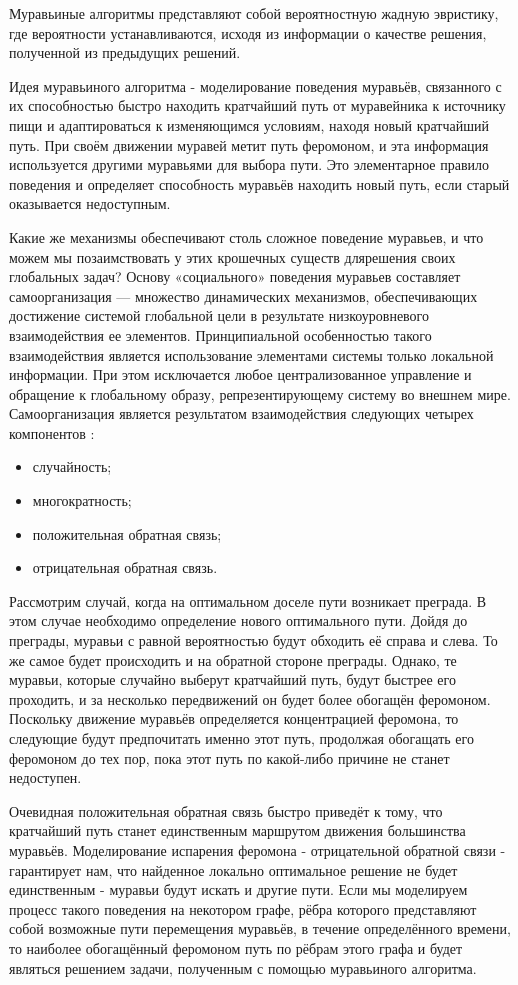 \documentclass[12pt]{report}
\begin{document}
Муравьиные алгоритмы представляют собой вероятностную жадную эвристику, где вероятности устанавливаются, исходя из информации о качестве решения, полученной из предыдущих решений.

Идея муравьиного алгоритма - моделирование поведения муравьёв, связанного с их способностью быстро находить кратчайший путь от муравейника к источнику пищи и адаптироваться к изменяющимся условиям, находя новый кратчайший путь\cite{ant1}. При своём движении муравей метит путь феромоном, и эта информация используется другими муравьями для выбора пути. Это элементарное правило поведения и определяет способность муравьёв находить новый путь, если старый оказывается недоступным.

Какие же механизмы обеспечивают столь сложное поведение муравьев, и что можем мы позаимствовать у этих крошечных существ длярешения своих глобальных задач? Основу «социального» поведения муравьев составляет самоорганизация — множество динамических механизмов, обеспечивающих достижение системой глобальной цели в результате низкоуровневого взаимодействия ее элементов. Принципиальной особенностью такого взаимодействия является использование элементами системы только локальной информации. При этом исключается любое централизованное управление и обращение к глобальному образу, репрезентирующему систему во внешнем мире. Самоорганизация является результатом взаимодействия следующих четырех компонентов \cite{shtovba} :
\begin{itemize}
	\item случайность;
	\item многократность;
	\item положительная обратная связь;
	\item отрицательная обратная связь.
\end{itemize}

Рассмотрим случай, когда на оптимальном доселе пути возникает преграда. В этом случае необходимо определение нового оптимального пути. Дойдя до преграды, муравьи с равной вероятностью будут обходить её справа и слева. То же самое будет происходить и на обратной стороне преграды. Однако, те муравьи, которые случайно выберут кратчайший путь, будут быстрее его проходить, и за несколько передвижений он будет более обогащён феромоном. Поскольку движение муравьёв определяется концентрацией феромона, то следующие будут предпочитать именно этот путь, продолжая обогащать его феромоном до тех пор, пока этот путь по какой-либо причине не станет недоступен.

Очевидная положительная обратная связь быстро приведёт к тому, что кратчайший путь станет единственным маршрутом движения большинства муравьёв. Моделирование испарения феромона - отрицательной обратной связи - гарантирует нам, что найденное локально оптимальное решение не будет единственным - муравьи будут искать и другие пути. Если мы моделируем процесс такого поведения на некотором графе, рёбра которого представляют собой возможные пути перемещения муравьёв, в течение определённого времени, то наиболее обогащённый феромоном путь по рёбрам этого графа и будет являться решением задачи, полученным с помощью муравьиного алгоритма.
\end{document}
